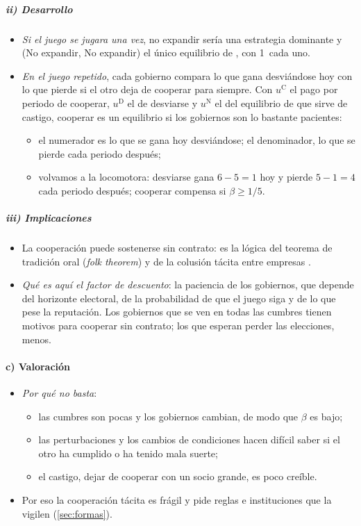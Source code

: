 \documentclass[11pt]{article}
\begin{document}
\subparagraph{ii) Desarrollo}
\begin{itemize}
\item \emph{Si el juego se jugara una vez}, no expandir sería una estrategia dominante y (No expandir, No expandir) el único equilibrio de , con 1~cada uno.
\item \emph{En el juego repetido}, cada gobierno compara lo que gana desviándose hoy con lo que pierde si el otro deja de cooperar para siempre. Con $u^{\mathrm C}$ el pago por periodo de cooperar, $u^{\mathrm D}$ el de desviarse y $u^{\mathrm N}$ el del equilibrio de  que sirve de castigo, cooperar es un equilibrio si los gobiernos son lo bastante pacientes:
  \begin{itemize}
  \item el numerador es lo que se gana hoy desviándose; el denominador, lo que se pierde cada periodo después;
  \item volvamos a la locomotora: desviarse gana $6-5=1$ hoy y pierde $5-1=4$ cada periodo después; cooperar compensa si $\beta\geq1/5$.
  \end{itemize}
\end{itemize}

\subparagraph{iii) Implicaciones}
\begin{itemize}
\item La cooperación puede sostenerse sin contrato: es la lógica del teorema de tradición oral (\emph{folk theorem})  y de la colusión tácita entre empresas .
\item \emph{Qué es aquí el factor de descuento}: la paciencia de los gobiernos, que depende del horizonte electoral, de la probabilidad de que el juego siga y de lo que pese la reputación. Los gobiernos que se ven en todas las cumbres tienen motivos para cooperar sin contrato; los que esperan perder las elecciones, menos.
\end{itemize}

\paragraph{c) Valoración}
\begin{itemize}
\item \emph{Por qué no basta}:
  \begin{itemize}
  \item las cumbres son pocas y los gobiernos cambian, de modo que $\beta$ es bajo;
  \item las perturbaciones y los cambios de condiciones hacen difícil saber si el otro ha cumplido o ha tenido mala suerte;
  \item el castigo, dejar de cooperar con un socio grande, es poco creíble.
  \end{itemize}
\item Por eso la cooperación tácita es frágil y pide reglas e instituciones que la vigilen (\ref{sec:formas}).
\end{itemize}
\end{document}
